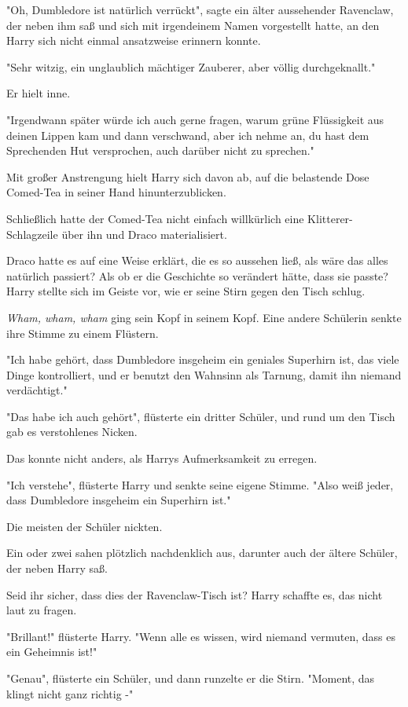 {"Oh, Dumbledore ist natürlich verrückt", sagte ein älter aussehender Ravenclaw, der neben ihm saß und sich mit irgendeinem Namen vorgestellt hatte, an den Harry sich nicht einmal ansatzweise erinnern konnte.

"Sehr witzig, ein unglaublich mächtiger Zauberer, aber völlig durchgeknallt."

Er hielt inne.

"Irgendwann später würde ich auch gerne fragen, warum grüne Flüssigkeit aus deinen Lippen kam und dann verschwand, aber ich nehme an, du hast dem Sprechenden Hut versprochen, auch darüber nicht zu sprechen."

Mit großer Anstrengung hielt Harry sich davon ab, auf die belastende Dose Comed-Tea in seiner Hand hinunterzublicken.

Schließlich hatte der Comed-Tea nicht einfach willkürlich eine Klitterer-Schlagzeile über ihn und Draco materialisiert.

Draco hatte es auf eine Weise erklärt, die es so aussehen ließ, als wäre das alles natürlich passiert? Als ob er die Geschichte so verändert hätte, dass sie passte? Harry stellte sich im Geiste vor, wie er seine Stirn gegen den Tisch schlug.

\emph{Wham, wham, wham} ging sein Kopf in seinem Kopf. Eine andere Schülerin senkte ihre Stimme zu einem Flüstern.

"Ich habe gehört, dass Dumbledore insgeheim ein geniales Superhirn ist, das viele Dinge kontrolliert, und er benutzt den Wahnsinn als Tarnung, damit ihn niemand verdächtigt."

"Das habe ich auch gehört", flüsterte ein dritter Schüler, und rund um den Tisch gab es verstohlenes Nicken.

Das konnte nicht anders, als Harrys Aufmerksamkeit zu erregen.

"Ich verstehe", flüsterte Harry und senkte seine eigene Stimme. "Also weiß jeder, dass Dumbledore insgeheim ein Superhirn ist."

Die meisten der Schüler nickten.

Ein oder zwei sahen plötzlich nachdenklich aus, darunter auch der ältere Schüler, der neben Harry saß.

Seid ihr sicher, dass dies der Ravenclaw-Tisch ist? Harry schaffte es, das nicht laut zu fragen.

"Brillant!" flüsterte Harry. "Wenn alle es wissen, wird niemand vermuten, dass es ein Geheimnis ist!"

"Genau", flüsterte ein Schüler, und dann runzelte er die Stirn. "Moment, das klingt nicht ganz richtig -"

}

